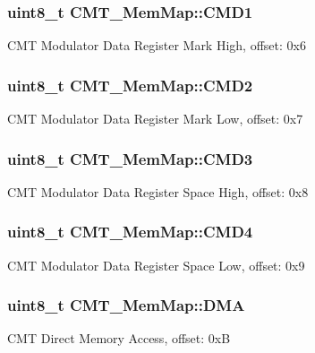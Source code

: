\subsubsection[{C\+M\+D1}]{\setlength{\rightskip}{0pt plus 5cm}uint8\+\_\+t C\+M\+T\+\_\+\+Mem\+Map\+::\+C\+M\+D1}\label{struct_c_m_t___mem_map_a6771f22304d3dc09e2c1df31985a1f2a}
C\+M\+T Modulator Data Register Mark High, offset\+: 0x6 \hypertarget{struct_c_m_t___mem_map_a40660a71cbcc2c0a2b0690bf2f8017d3}{}
\subsubsection[{C\+M\+D2}]{\setlength{\rightskip}{0pt plus 5cm}uint8\+\_\+t C\+M\+T\+\_\+\+Mem\+Map\+::\+C\+M\+D2}\label{struct_c_m_t___mem_map_a40660a71cbcc2c0a2b0690bf2f8017d3}
C\+M\+T Modulator Data Register Mark Low, offset\+: 0x7 \hypertarget{struct_c_m_t___mem_map_a7918a8c8dfb707fc6ac973f26495d20d}{}
\subsubsection[{C\+M\+D3}]{\setlength{\rightskip}{0pt plus 5cm}uint8\+\_\+t C\+M\+T\+\_\+\+Mem\+Map\+::\+C\+M\+D3}\label{struct_c_m_t___mem_map_a7918a8c8dfb707fc6ac973f26495d20d}
C\+M\+T Modulator Data Register Space High, offset\+: 0x8 \hypertarget{struct_c_m_t___mem_map_a0e59339adacb7b8a3b1867bb5bf23d0d}{}
\subsubsection[{C\+M\+D4}]{\setlength{\rightskip}{0pt plus 5cm}uint8\+\_\+t C\+M\+T\+\_\+\+Mem\+Map\+::\+C\+M\+D4}\label{struct_c_m_t___mem_map_a0e59339adacb7b8a3b1867bb5bf23d0d}
C\+M\+T Modulator Data Register Space Low, offset\+: 0x9 \hypertarget{struct_c_m_t___mem_map_a3fec559e64d6d6210cbecbbb8368adda}{}
\subsubsection[{D\+M\+A}]{\setlength{\rightskip}{0pt plus 5cm}uint8\+\_\+t C\+M\+T\+\_\+\+Mem\+Map\+::\+D\+M\+A}\label{struct_c_m_t___mem_map_a3fec559e64d6d6210cbecbbb8368adda}
C\+M\+T Direct Memory Access, offset\+: 0x\+B \hypertarget{struct_c_m_t___mem_map_ad1905c6966e1ac635348ce19d5c44ae9}{}
